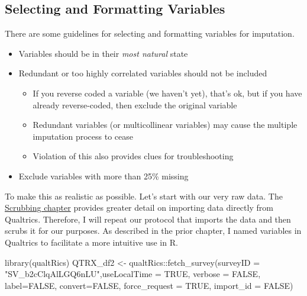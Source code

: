\documentclass[
  11pt,
]{book}
\newenvironment{Shaded}{\begin{snugshade}}{\end{snugshade}}
\newcommand{\AttributeTok}[1]{\textcolor[rgb]{0.77,0.63,0.00}{#1}}
\newcommand{\ConstantTok}[1]{\textcolor[rgb]{0.00,0.00,0.00}{#1}}
\newcommand{\FunctionTok}[1]{\textcolor[rgb]{0.00,0.00,0.00}{#1}}
\newcommand{\NormalTok}[1]{#1}
\newcommand{\OtherTok}[1]{\textcolor[rgb]{0.56,0.35,0.01}{#1}}
\newcommand{\SpecialCharTok}[1]{\textcolor[rgb]{0.00,0.00,0.00}{#1}}
\newcommand{\StringTok}[1]{\textcolor[rgb]{0.31,0.60,0.02}{#1}}
\providecommand{\tightlist}{%
  \setlength{\itemsep}{0pt}\setlength{\parskip}{0pt}}
\begin{document}
\hypertarget{selecting-and-formatting-variables}{%
\subsection{Selecting and Formatting Variables}\label{selecting-and-formatting-variables}}

There are some guidelines for selecting and formatting variables for imputation.

\begin{itemize}
\tightlist
\item
  Variables should be in their \emph{most natural} state
\item
  Redundant or too highly correlated variables should not be included

  \begin{itemize}
  \tightlist
  \item
    If you reverse coded a variable (we haven't yet), that's ok, but if you have already reverse-coded, then exclude the original variable
  \item
    Redundant variables (or multicollinear variables) may cause the multiple imputation process to cease
  \item
    Violation of this also provides clues for troubleshooting
  \end{itemize}
\item
  Exclude variables with more than 25\% missing
\end{itemize}

To make this as realistic as possible. Let's start with our very raw data. The \protect\hyperlink{scrub}{Scrubbing chapter} provides greater detail on importing data directly from Qualtrics. Therefore, I will repeat our protocol that imports the data and then scrubs it for our purposes. As described in the prior chapter, I named variables in Qualtrics to facilitate a more intuitive use in R.

\begin{Shaded}
\begin{Highlighting}[]
\FunctionTok{library}\NormalTok{(qualtRics)}
\NormalTok{QTRX\_df2 }\OtherTok{\textless{}{-}}\NormalTok{ qualtRics}\SpecialCharTok{::}\FunctionTok{fetch\_survey}\NormalTok{(}\AttributeTok{surveyID =} \StringTok{"SV\_b2cClqAlLGQ6nLU"}\NormalTok{,}\AttributeTok{useLocalTime =} \ConstantTok{TRUE}\NormalTok{,}
                         \AttributeTok{verbose =} \ConstantTok{FALSE}\NormalTok{, }\AttributeTok{label=}\ConstantTok{FALSE}\NormalTok{, }\AttributeTok{convert=}\ConstantTok{FALSE}\NormalTok{, }\AttributeTok{force\_request =} \ConstantTok{TRUE}\NormalTok{, }\AttributeTok{import\_id =} \ConstantTok{FALSE}\NormalTok{)}
\end{Highlighting}
\end{Shaded}
\end{document}
